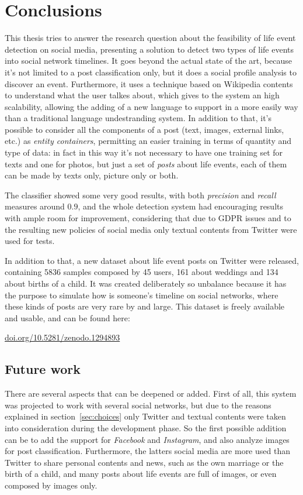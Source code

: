 \chapter{Conclusions}
\label{cha:conclusions}
This thesis tries to answer the research question about the feasibility of life event detection on social media, presenting a solution to detect two types of life events into social network timelines. It goes beyond the actual state of the art, because it's not limited to a post classification only, but it does a social profile analysis to discover an event. Furthermore, it uses a technique based on Wikipedia contents to understand what the user talkes about, which gives to the system an high scalability, allowing the adding of a new language to support in a more easily way than a traditional language undestranding system. In addition to that, it's possible to consider all the components of a post (text, images, external links, etc.) as \emph{entity containers}, permitting an easier training in terms of quantity and type of data: in fact in this way it's not necessary to have one training set for texts and one for photos, but just a set of \emph{posts} about life events, each of them can be made by texts only, picture only or both.

The classifier showed some very good results, with both \emph{precision} and \emph{recall} measures around $0.9$, and the whole detection system had encouraging results with ample room for improvement, considering that due to GDPR issues and to the resulting new policies of social media only textual contents from Twitter were used for tests.

In addition to that, a new dataset about life event posts on Twitter were released, containing 5836 samples composed by 45 users, 161 about weddings and 134 about births of a child. It was created deliberately so unbalance because it has the purpose to simulate how is someone's timeline on social networks, where these kinds of posts are very rare by and large. This dataset is freely available and usable, and can be found here:
\begin{center}
\url{doi.org/10.5281/zenodo.1294893}
\end{center}

\section{Future work}
\label{sec:futurework}
There are several aspects that can be deepened or added. First of all, this system was projected to work with several social networks, but due to the reasons explained in section~\ref{sec:choices} only Twitter and textual contents were taken into consideration during the development phase. So the first possible addition can be to add the support for \emph{Facebook} and \emph{Instagram}, and also analyze images for post classification. Furthermore, the latters social media are more used than Twitter to share personal contents and news, such as the own marriage or the birth of a child, and many posts about life events are full of images, or even composed by images only.

